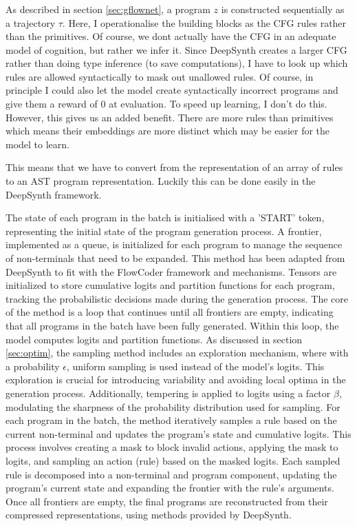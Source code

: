 \subsubsection{}


As described in section \ref{sec:gflownet}, a program $z$ is constructed sequentially as a trajectory $\tau$. Here, I operationalise the building blocks as the CFG rules rather than the primitives. 
Of course, we dont actually have the CFG in an adequate model of cognition, but rather we infer it.
Since DeepSynth creates a larger CFG rather than doing type inference (to save computations), I have to look up which rules are allowed syntactically to mask out unallowed rules. Of course, in principle I could also let the model create syntactically incorrect programs and give them a reward of 0 at evaluation. To speed up learning, I don't do this. However, this gives us an added benefit. There are more rules than primitives which means their embeddings are more distinct which may be easier for the model to learn.

This means that we have to convert from the representation of an array of rules to an AST program representation. Luckily this can be done easily in the DeepSynth framework.


The state of each program in the batch is initialised with a 'START' token, representing the initial state of the program generation process. A frontier, implemented as a queue, is initialized for each program to manage the sequence of non-terminals that need to be expanded. This method has been adapted from DeepSynth to fit with the FlowCoder framework and mechanisms. 
Tensors are initialized to store cumulative logits and partition functions for each program, tracking the probabilistic decisions made during the generation process.
The core of the method is a loop that continues until all frontiers are empty, indicating that all programs in the batch have been fully generated. Within this loop, the model computes logits and partition functions.
As discussed in section \ref{sec:optim}, the sampling method includes an exploration mechanism, where with a probability $\epsilon$, uniform sampling is used instead of the model's logits. This exploration is crucial for introducing variability and avoiding local optima in the generation process. Additionally, tempering is applied to logits using a factor $\beta$, modulating the sharpness of the probability distribution used for sampling.
For each program in the batch, the method iteratively samples a rule based on the current non-terminal and updates the program's state and cumulative logits. This process involves creating a mask to block invalid actions, applying the mask to logits, and sampling an action (rule) based on the masked logits.
Each sampled rule is decomposed into a non-terminal and program component, updating the program's current state and expanding the frontier with the rule's arguments.
Once all frontiers are empty, the final programs are reconstructed from their compressed representations, using methods provided by DeepSynth.


